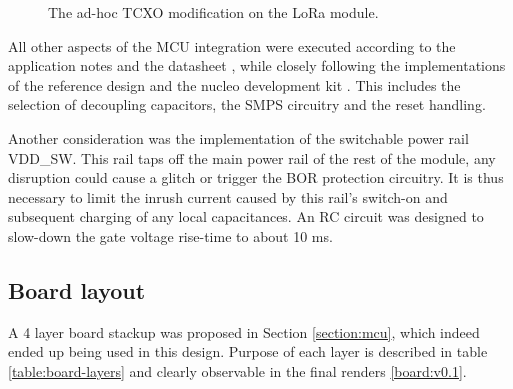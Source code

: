 \begin{figure}
    \centering
     \hfil
    \caption{\label{fig:tcxo-bodge}The ad-hoc TCXO modification on the LoRa module.}
\end{figure}

All other aspects of the MCU integration were executed according to the application notes and the datasheet  \cite{stmicroelectronics_stm32wle5xx_nodate,stmicroelectronics_how_nodate-1}, while closely following the implementations of the reference design and the nucleo development kit \cite{stmicroelectronics_stdes-wl5u4ilh_2024,stmicroelectronics_nucleo-wl55jc_2024}. This includes the selection of decoupling capacitors, the SMPS circuitry and the reset handling.

Another consideration was the implementation of the switchable power rail VDD\_SW. This rail taps off the main power rail of the rest of the module, any disruption could cause a glitch or trigger the BOR protection circuitry. It is thus necessary to limit the inrush current caused by this rail's switch-on and subsequent charging of any local capacitances. An RC circuit was designed to slow-down the gate voltage rise-time to about 10 ms.

\subsection{Board layout}
A 4 layer board stackup was proposed in Section \ref{section:mcu}, which indeed ended up being used in this design. Purpose of each layer is described in table \ref{table:board-layers} and clearly observable in the final renders \ref{board:v0.1}.

